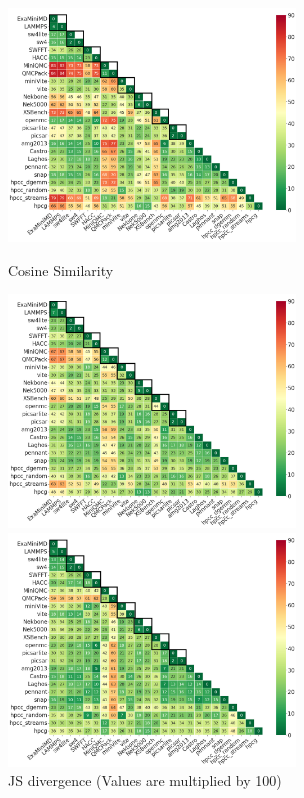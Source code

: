\documentclass[conference]{IEEEtran}
\begin{document}
\begin{figure}[htbp]
\centering
	\begin{minipage}[t]{0.48\textwidth}
	\centering
	\includegraphics[width=3in]{figs/Cosine_origin_color_tri20.png}
	\vspace*{-5mm}
	\caption{Cosine Similarity}
	\label{figs:Cosine}
	\end{minipage}
\hspace{.1in}
\begin{minipage}[t]{0.48\textwidth}
	\centering
	\includegraphics[width=3in]{figs/JS-divergence_m100.png}
	\vspace*{-5mm}
	\caption{JS divergence (Values are multiplied by 100)}
	\label{figs:JS}
	\end{minipage}
\hspace{.1in}
\begin{minipage}[t]{0.48\textwidth}
	\centering
	\includegraphics[width=3in]{figs/Wasserstein distance_m1000.png}

\end{minipage}
\end{figure}
\end{document}
